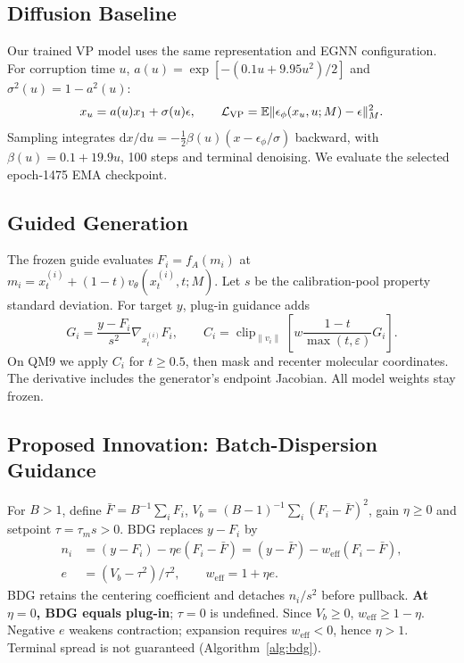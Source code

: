 \documentclass{article}
\newcommand{\Fbar}{\bar F}
\newcommand{\Vb}{V_b}
\newcommand{\weff}{w_{\mathrm{eff}}}
\begin{document}
\subsection{Diffusion Baseline}\label{sec:diff}
Our trained VP model uses the same representation and EGNN configuration. For corruption time $u$, $a(u)=\exp[-(0.1u+9.95u^2)/2]$ and $\sigma^2(u)=1-a^2(u)$:
\begin{equation}
x_u=a(u)x_1+\sigma(u)\epsilon,\qquad\mathcal L_{\rm VP}=\mathbb E\|\epsilon_\phi(x_u,u;M)-\epsilon\|_M^2.
\label{eq:vp}
\end{equation}
Sampling integrates $\mathrm dx/\mathrm du=-\frac12\beta(u)(x-\epsilon_\phi/\sigma)$ backward, with $\beta(u)=0.1+19.9u$, 100 steps and terminal denoising. We evaluate the selected epoch-1475 EMA checkpoint.

\subsection{Guided Generation}\label{sec:guidance}
The frozen guide evaluates $F_i=f_A(m_i)$ at $m_i=x_t^{(i)}+(1-t)v_\theta(x_t^{(i)},t;M)$. Let $s$ be the calibration-pool property standard deviation. For target $y$, plug-in guidance adds
\begin{equation}
G_i=\frac{y-F_i}{s^2}\nabla_{x_t^{(i)}}F_i,\qquad
C_i=\operatorname{clip}_{\|v_i\|}\!\left[w\frac{1-t}{\max(t,\varepsilon)}G_i\right].
\label{eq:plug}
\end{equation}
On QM9 we apply $C_i$ for $t\ge0.5$, then mask and recenter molecular coordinates. The derivative includes the generator's endpoint Jacobian. All model weights stay frozen.

\subsection{Proposed Innovation: Batch-Dispersion Guidance}\label{sec:bdg}
For $B>1$, define $\Fbar=B^{-1}\sum_iF_i$, $\Vb=(B-1)^{-1}\sum_i(F_i-\Fbar)^2$, gain $\eta\ge0$ and setpoint $\tau=\tau_m s>0$. BDG replaces $y-F_i$ by
\begin{equation}
\begin{aligned}
n_i&=(y-F_i)-\eta e(F_i-\Fbar)=(y-\Fbar)-\weff(F_i-\Fbar),\\
e&=(\Vb-\tau^2)/\tau^2,\qquad \weff=1+\eta e.
\end{aligned}\label{eq:bdg}
\end{equation}
BDG retains the centering coefficient and detaches $n_i/s^2$ before pullback. \textbf{At $\eta=0$, BDG equals plug-in}; $\tau=0$ is undefined. Since $V_b\ge0$, $\weff\ge1-\eta$. Negative $e$ weakens contraction; expansion requires $\weff<0$, hence $\eta>1$. Terminal spread is not guaranteed (Algorithm~\ref{alg:bdg}).
\end{document}
